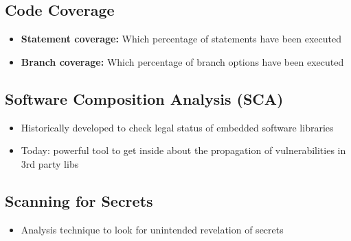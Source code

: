 \subsection{Code Coverage}
\begin{itemize}
    \item \textbf{Statement coverage:} Which percentage of statements have been executed
    \item \textbf{Branch coverage:} Which percentage of branch options have been executed
\end{itemize}

\subsection{Software Composition Analysis (SCA)}
\begin{itemize}
    \item Historically developed to check legal status of embedded software libraries
    \item Today: powerful tool to get inside about the propagation of vulnerabilities in 3rd party libs
\end{itemize}

\subsection{Scanning for Secrets}
\begin{itemize}
    \item Analysis technique to look for unintended revelation of secrets
\end{itemize}